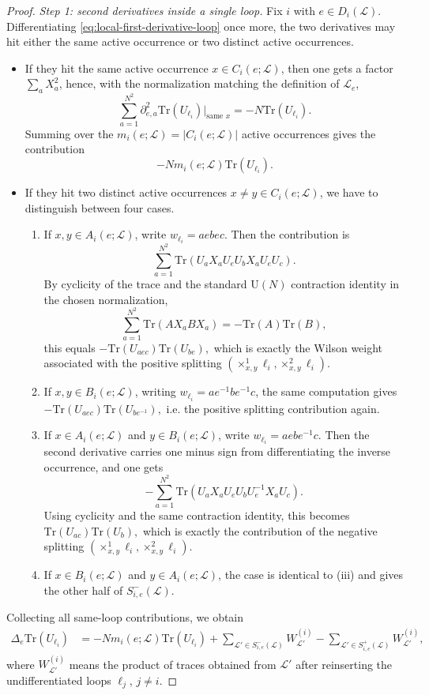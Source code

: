 \documentclass[11pt,a4paper,reqno]{article}
\theoremstyle{definition}
\theoremstyle{remark}
\newcommand\U{{\mathrm U}}
\newcommand\Tr{\mathrm{Tr}}
\newcommand\Lc{{\mathcal{L}}}
\begin{document}
\begin{proof}
\emph{Step 1: second derivatives inside a single loop.}
Fix $i$ with $e\in D_i(\Lc)$. Differentiating \eqref{eq:local-first-derivative-loop} once more, the two derivatives may hit either the same active occurrence or two distinct active occurrences.
\begin{itemize}
\item If they hit the same active occurrence $x\in C_i(e;\Lc)$, then one gets a factor $\sum_a X_a^2$, hence, with the normalization matching the definition of $\Lc_e$,
\[
\sum_{a=1}^{N^2}\partial_{e,a}^2 \Tr(U_{\ell_i})\Big|_{\text{same }x}=-N\Tr(U_{\ell_i}).
\]
Summing over the $m_i(e;\Lc)=|C_i(e;\Lc)|$ active occurrences gives the contribution
\[
-Nm_i(e;\Lc)\Tr(U_{\ell_i}).
\]
\item If they hit two distinct active occurrences $x\neq y\in C_i(e;\Lc)$, we have to distinguish between four cases.
\begin{enumerate}
\item If $x,y\in A_i(e;\Lc)$, write $w_{\ell_i}=aebec$. Then the contribution is
\[
\sum_{a=1}^{N^2}\Tr(U_aX_aU_eU_bX_aU_eU_c).
\]
By cyclicity of the trace and the standard $\U(N)$ contraction identity in the chosen
normalization,
\[
\sum_{a=1}^{N^2}\Tr(AX_aBX_a)=-\Tr(A)\Tr(B),
\]
this equals $-\Tr(U_{aec})\Tr(U_{be}),$ which is exactly the Wilson weight associated with the positive splitting $(\times^1_{x,y}\ell_i,\times^2_{x,y}\ell_i)$.
\item If $x,y\in B_i(e;\Lc)$, writing $w_{\ell_i}=ae^{-1}be^{-1}c$, the same computation gives $-\Tr(U_{aec})\Tr(U_{be^{-1}}),$
 i.e. the positive splitting contribution again.
\item If $x\in A_i(e;\Lc)$ and $y\in B_i(e;\Lc)$, write $w_{\ell_i}=aebe^{-1}c$. Then the second
derivative carries one minus sign from differentiating the inverse occurrence, and one gets
\[
-\sum_{a=1}^{N^2}\Tr(U_aX_aU_eU_bU_e^{-1}X_aU_c).
\]
Using cyclicity and the same contraction identity, this becomes $\Tr(U_{ac})\Tr(U_b),$ which is exactly the contribution of the negative splitting $(\times^1_{x,y}\ell_i,\times^2_{x,y}\ell_i)$.
\item If $x\in B_i(e;\Lc)$ and $y\in A_i(e;\Lc)$, the case is identical to (iii) and gives the other half of
$S^-_{i,e}(\Lc)$.
\end{enumerate}
\end{itemize}

Collecting all same-loop contributions, we obtain
\begin{align}
\Delta_e\Tr(U_{\ell_i}) &=-Nm_i(e;\Lc)\Tr(U_{\ell_i})+ \sum_{\Lc'\in S^-_{i,e}(\Lc)} W_{\Lc'}^{(i)}- \sum_{\Lc'\in S^+_{i,e}(\Lc)} W_{\Lc'}^{(i)},\label{eq:single-loop-Laplacian}
\end{align}
where $W_{\Lc'}^{(i)}$ means the product of traces obtained from $\Lc'$ after reinserting the undifferentiated loops $\ell_j$, $j\neq i$.


\end{proof}
\end{document}
